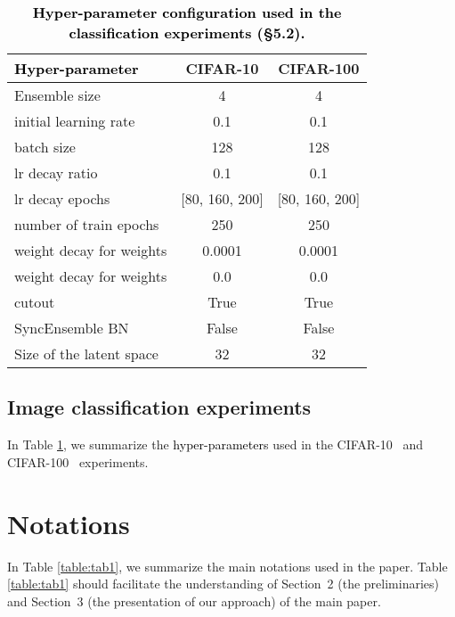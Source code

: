 \documentclass[10pt,twocolumn,letterpaper]{article}
\newcommand{\ab}[1]{\textcolor{black}{#1}}
\begin{document}
\begin{table}[t!]
\renewcommand{\figurename}{Table}
\renewcommand{\captionlabelfont}{\bf}
\renewcommand{\captionfont}{\small}
\begin{center}
\scalebox{0.85}
{
\begin{tabular}{l|c|c}
\toprule
 \ab{\textbf{Hyper-parameter}} &   \textbf{CIFAR-10}  & \textbf{CIFAR-100} \\ 
\midrule
Ensemble size           &4 & 4 \\ 
\midrule
 initial learning rate         &0.1 &0.1 \\ 
 \midrule
batch size        &128 & 128 \\ 
 \midrule
lr decay ratio     &0.1 & 0.1 \\ 
 \midrule
 lr decay epochs         &[80, 160, 200] & [80, 160, 200] \\ 
 \midrule
number of train epochs  &250 & 250 \\ 
\midrule
 weight decay for      weights  &0.0001 & 0.0001 \\ 
 \midrule
  weight decay for     weights   &0.0 & 0.0 \\ 
 \midrule
 cutout         & True& True \\ 
 \midrule
 SyncEnsemble BN        & False & False \\ 
  \midrule
 Size of the latent space         & 32 & 32 \\ 
\bottomrule
\end{tabular}
}
\end{center}
\caption{
\ab{\textbf{Hyper-parameter configuration used in the classification experiments (\S5.2).}}
} 
\label{table:tab2}
\vspace{-3pt}
\end{table}


\subsection{Image classification experiments}

In Table \ref{table:tab2}, we summarize the \ab{hyper-parameters} used in the CIFAR-10~\cite{krizhevsky2009learning} and CIFAR-100~\cite{krizhevsky2009learning} experiments. 




\section{Notations}

In Table \ref{table:tab1}, we summarize the {main} notations used in the paper. Table \ref{table:tab1} should facilitate the understanding of Section~2 (the preliminaries) and Section~3 (the presentation of our approach) of the main paper.
\end{document}
